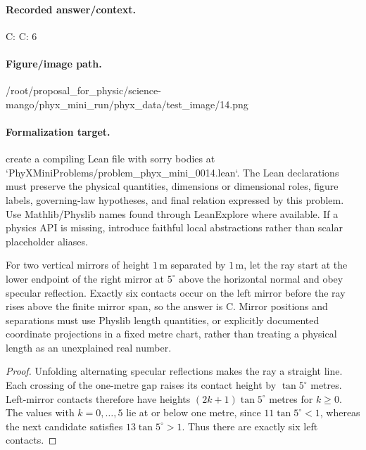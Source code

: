 \paragraph{Recorded answer/context.}
C: C: 6

\paragraph{Figure/image path.}
/root/proposal\_for\_physic/science-mango/phyx\_mini\_run/phyx\_data/test\_image/14.png

\paragraph{Formalization target.}
create a compiling Lean file with sorry bodies at `PhyXMiniProblems/problem\_phyx\_mini\_0014.lean`. The Lean declarations must preserve the physical quantities, dimensions or dimensional roles, figure labels, governing-law hypotheses, and final relation expressed by this problem.
Use Mathlib/Physlib names found through LeanExplore where available. If a physics API is missing, introduce faithful local abstractions rather than scalar placeholder aliases.

\begin{theorem}
\label{thm:physics:phyx_mini_0014:target}
For two vertical mirrors of height $1\,\mathrm m$ separated by
$1\,\mathrm m$, let the ray start at the lower endpoint of the right mirror
at $5^\circ$ above the horizontal normal and obey specular reflection.
Exactly six contacts occur on the left mirror before the ray rises above the
finite mirror span, so the answer is C. Mirror positions and separations must
use Physlib length quantities, or explicitly documented coordinate
projections in a fixed metre chart, rather than treating a physical length as
an unexplained real number.
\end{theorem}
\begin{proof}
Unfolding alternating specular reflections makes the ray a straight line.
Each crossing of the one-metre gap raises its contact height by
$\tan 5^\circ$ metres. Left-mirror contacts therefore have heights
$(2k+1)\tan 5^\circ$ metres for $k\geq0$. The values with
$k=0,\ldots,5$ lie at or below one metre, since
$11\tan 5^\circ<1$, whereas the next candidate satisfies
$13\tan 5^\circ>1$. Thus there are exactly six left contacts.
\end{proof}

